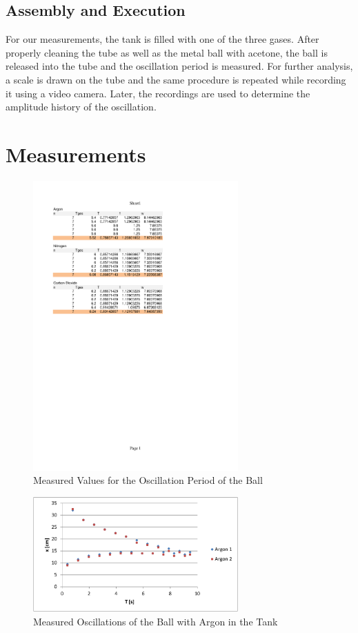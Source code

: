 \documentclass{scrreprt}
\begin{document}
\subsection{Assembly and Execution}
For our measurements, the tank is filled with one of the three gases. After properly cleaning the tube as well as the metal ball with acetone, the ball is released into the tube and the oscillation period is measured. For further analysis, a scale is drawn on the tube and the same procedure is repeated while recording it using a video camera. Later, the recordings are used to determine the amplitude history of the oscillation.

\section{Measurements}
\begin{figure}[H]
	\centering
  \includegraphics[width=0.7\textwidth]{diag/rawvals.pdf}
	\caption{Measured Values for the Oscillation Period of the Ball}
	\label{fig:measurement}
\end{figure}

\begin{figure}[H]
	\centering
  \includegraphics[width=0.7\textwidth]{diag/argon.pdf}
	\caption{Measured Oscillations of the Ball with Argon in the Tank}
	\label{fig:argon}
\end{figure}
\end{document}
